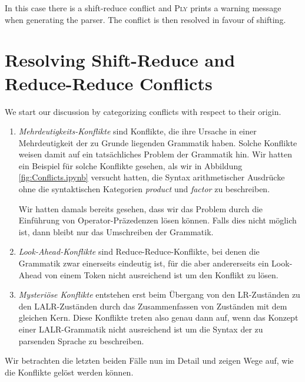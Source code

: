 \begin{enumerate}
\begin{enumerate}[(a)]
            In this case there is a shift-reduce conflict and \textsc{Ply} prints a warning message when
            generating the parser.  The conflict is then resolved in favour of shifting.
      \end{enumerate}
\end{enumerate}


\section{Resolving Shift-Reduce and Reduce-Reduce Conflicts}
We start our discussion by categorizing conflicts with respect to their origin.
\begin{enumerate}
\item \emph{Mehrdeutigkeits-Konflikte} sind Konflikte, die ihre Ursache in einer Mehrdeutigkeit
      der zu Grunde liegenden Grammatik haben.  Solche Konflikte weisen damit auf ein tats\"achliches
      Problem der Grammatik hin.  Wir hatten ein Beispiel f\"ur solche Konflikte gesehen, als wir in
      Abbildung \ref{fig:Conflicts.ipynb} 
      versucht hatten, die Syntax arithmetischer Ausdr\"ucke ohne die syntaktischen
      Kategorien \textsl{product} und \textsl{factor} zu beschreiben.

      Wir hatten damals bereits gesehen, dass wir das Problem durch die Einf\"uhrung von
      Operator-Pr\"azedenzen l\"osen k\"onnen.  Falls dies nicht m\"oglich ist, dann bleibt nur das
      Umschreiben der Grammatik.
\item \emph{Look-Ahead-Konflikte} sind Reduce-Reduce-Konflikte, bei denen die Grammatik zwar
      einerseits eindeutig ist, f\"ur die aber andererseits
      ein Look-Ahead von einem Token nicht ausreichend ist um den Konflikt zu l\"osen.
\item \emph{Mysteri\"ose Konflikte} entstehen erst beim \"Ubergang von den LR-Zust\"anden zu den LALR-Zust\"anden 
      durch das Zusammenfassen von Zust\"anden mit dem gleichen Kern.  Diese Konflikte treten also
      genau dann auf, wenn das Konzept einer LALR-Grammatik nicht ausreichend ist um die Syntax der
      zu parsenden Sprache zu beschreiben.
\end{enumerate}
Wir betrachten die letzten beiden F\"alle nun im Detail und zeigen Wege auf, wie die Konflikte gel\"ost
werden k\"onnen.

